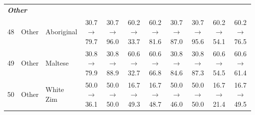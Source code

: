 \begin{table}[t]
{\begin{tabular}{rll c c c c c c c c}
\midrule
\multicolumn{11}{l}{\textit{\textbf{Other}}} \\
48 & Other & Aboriginal & 30.7$\rightarrow$79.7 & 30.7$\rightarrow$96.0 & 60.2$\rightarrow$33.7 & 60.2$\rightarrow$81.6 & 30.7$\rightarrow$87.0 & 30.7$\rightarrow$95.6 & 60.2$\rightarrow$54.1 & 60.2$\rightarrow$76.5 \\
49 & Other & Maltese & 30.8$\rightarrow$79.9 & 30.8$\rightarrow$88.9 & 60.6$\rightarrow$32.7 & 60.6$\rightarrow$66.8 & 30.8$\rightarrow$84.6 & 30.8$\rightarrow$87.3 & 60.6$\rightarrow$54.5 & 60.6$\rightarrow$61.4 \\
50 & Other & White Zim & 50.0$\rightarrow$36.1 & 50.0$\rightarrow$50.0 & 16.7$\rightarrow$49.3 & 16.7$\rightarrow$48.7 & 50.0$\rightarrow$46.0 & 50.0$\rightarrow$50.0 & 16.7$\rightarrow$21.4 & 16.7$\rightarrow$49.5 \\
\bottomrule
\end{tabular}
}
\end{table}